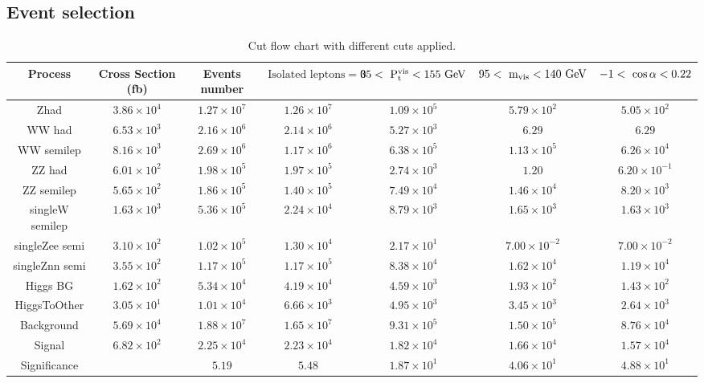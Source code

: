   \subsection{Event selection}


    \begin{table}
    \scriptsize{
    \centering
      \begin{tabular}{c c c c c c c}
           \hline
           {Process} & {Cross Section (fb)} & {Events number} & {$\text{Isolated leptons} = 0$} & {$35 <~\rm{{P}_{t}^{vis}} < 155~\rm{GeV} $} & {$95 <~\rm{m_{vis}}< 140~\rm{GeV}$} & {$-1 <~\rm{\cos{\alpha}}< 0.22$} \tabularnewline \hline
           \hline
           Zhad            &$ 3.86\times 10^{4} $&$	1.27\times 10^{7} $&$ 1.26\times 10^{7} $&$ 1.09\times 10^{5} $&$ 5.79\times 10^{2} $ &$	5.05\times 10^{2} $\tabularnewline \hline
           WW had          &$ 6.53\times 10^{3} $&$	2.16\times 10^{6} $&$	2.14\times 10^{6} $&$	5.27\times 10^{3} $&$	6.29      $         &$	6.29 $\tabularnewline \hline
           WW semilep      &$ 8.16\times 10^{3} $&$	2.69\times 10^{6} $&$	1.17\times 10^{6} $&$	6.38\times 10^{5} $&$	1.13\times 10^{5} $ &$  6.26\times 10^{4} $\tabularnewline \hline
           ZZ had          &$ 6.01\times 10^{2} $&$	1.98\times 10^{5} $&$	1.97\times 10^{5} $&$	2.74\times 10^{3} $&$	1.20 $              &$  6.20\times 10^{-1} $\tabularnewline \hline
           ZZ semilep      &$ 5.65\times 10^{2} $&$ 1.86\times 10^{5} $&$ 1.40\times 10^{5} $&$ 7.49\times 10^{4} $&$ 1.46\times 10^{4} $ &$  8.20\times 10^{3} $\tabularnewline \hline
           singleW semilep &$ 1.63\times 10^{3} $&$ 5.36\times 10^{5} $&$	2.24\times 10^{4} $&$	8.79\times 10^{3} $&$	1.65\times 10^{3} $ &$	1.63\times 10^{3} $\tabularnewline \hline
           singleZee semi  &$ 3.10\times 10^{2} $&$	1.02\times 10^{5} $&$	1.30\times 10^{4} $&$	2.17\times 10^{1} $&$	7.00\times 10^{-2} $&$	7.00\times 10^{-2} $\tabularnewline \hline
           singleZnn semi  &$ 3.55\times 10^{2} $&$	1.17\times 10^{5} $&$ 1.17\times 10^{5} $&$	8.38\times 10^{4} $&$	1.62\times 10^{4} $ &$	1.19\times 10^{4} $\tabularnewline \hline
           Higgs BG        &$ 1.62\times 10^{2} $&$	5.34\times 10^{4} $&$ 4.19\times 10^{4} $&$ 4.59\times 10^{3} $&$	1.93\times 10^{2} $ &$	1.43\times 10^{2} $\tabularnewline \hline
           HiggsToOther    &$ 3.05\times 10^{1} $&$	1.01\times 10^{4} $&$	6.66\times 10^{3} $&$	4.95\times 10^{3} $&$ 3.45\times 10^{3} $ &$	2.64\times 10^{3} $\tabularnewline \hline
           \hline						
           Background     &$ 5.69\times 10^{4} $&$  1.88\times 10^{7} $&$	1.65\times 10^{7} $&$	9.31\times 10^{5} $&$ 1.50\times 10^{5} $ &$  8.76\times 10^{4} $\tabularnewline \hline
           Signal	        &$ 6.82\times 10^{2} $&$  2.25\times 10^{4} $&$	2.23\times 10^{4} $&$	1.82\times 10^{4} $&$	1.66\times 10^{4} $ &$	1.57\times 10^{4} $\tabularnewline \hline
           Significance   &                     &$	5.19              $&$	5.48 $             &$	1.87\times 10^{1} $&$	4.06\times 10^{1} $ &$  4.88\times 10^{1} $\tabularnewline \hline
     \end{tabular}
    }
    \caption{Cut flow chart with different cuts applied.}
    \label{tab:cutFlow}
  \end{table}

